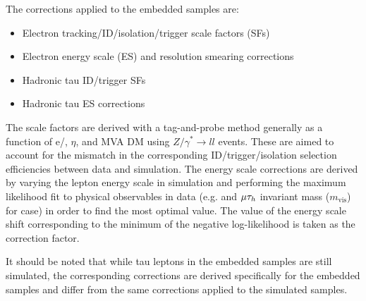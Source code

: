 The corrections applied to the embedded samples are:
\begin{itemize}
    \item Electron tracking/ID/isolation/trigger scale factors (SFs)
    \item Electron energy scale (ES) and resolution smearing corrections
    \item Hadronic tau ID/trigger SFs
    \item Hadronic tau ES corrections
\end{itemize}

The scale factors are derived with a tag-and-probe method \cite{CMS:2010svw} generally as a function of e/\tauh \pt, $\eta$, and MVA DM using $Z/\gamma^*\to ll$ events. These are aimed to account for the mismatch in the corresponding ID/trigger/isolation selection efficiencies between data and simulation. The energy scale corrections are derived by varying the lepton energy scale in simulation and performing the maximum likelihood fit to physical observables in data (e.g. \tauh and $\mu\tau_h$ invariant mass ($m_\text{vis}$) for \tauh case) in order to find the most optimal value. The value of the energy scale shift corresponding to the minimum of the negative log-likelihood is taken as the correction factor.

It should be noted that while tau leptons in the embedded samples are still simulated, the corresponding corrections are derived specifically for the embedded samples and differ from the same corrections applied to the simulated samples.

